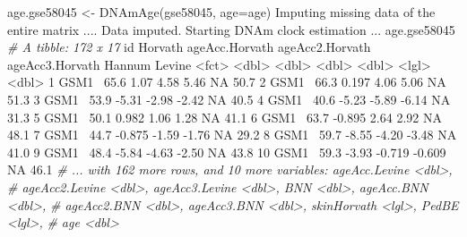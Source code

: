 \documentclass[]{article}
\newcommand{\hlnum}[1]{\textcolor[rgb]{0.816,0.125,0.439}{#1}}%
\newcommand{\hlstr}[1]{\textcolor[rgb]{0.251,0.627,0.251}{#1}}%
\newcommand{\hlcom}[1]{\textcolor[rgb]{0.502,0.502,0.502}{\textit{#1}}}%
\newcommand{\hlopt}[1]{\textcolor[rgb]{0,0,0}{#1}}%
\newcommand{\hlstd}[1]{\textcolor[rgb]{0.251,0.251,0.251}{#1}}%
\newcommand{\hlkwc}[1]{\textcolor[rgb]{0.251,0.251,0.251}{#1}}%
\newcommand{\hlkwd}[1]{\textcolor[rgb]{0.878,0.439,0.125}{#1}}%
\newenvironment{Shaded}{\begin{myshaded}}{\end{myshaded}}
\newcommand{\KeywordTok}[1]{\hlkwd{#1}}
\newcommand{\DataTypeTok}[1]{\hlkwc{#1}}
\newcommand{\DecValTok}[1]{\hlnum{#1}}
\newcommand{\FloatTok}[1]{\hlnum{#1}}
\newcommand{\StringTok}[1]{\hlstr{#1}}
\newcommand{\CommentTok}[1]{\hlcom{#1}}
\newcommand{\OtherTok}[1]{{#1}}
\newcommand{\OperatorTok}[1]{\hlopt{#1}}
\newcommand{\ErrorTok}[1]{\textcolor{errorcolor}{#1}}
\newcommand{\NormalTok}[1]{\hlstd{#1}}
\begin{document}
\begin{Shaded}
\begin{Highlighting}[]
\NormalTok{age.gse58045 <-}\StringTok{ }\KeywordTok{DNAmAge}\NormalTok{(gse58045, }\DataTypeTok{age=}\NormalTok{age)}
\NormalTok{  Imputing missing data of the entire matrix .... }
\NormalTok{  Data imputed. Starting DNAm clock estimation ...}
\NormalTok{age.gse58045}
  \CommentTok{# A tibble: 172 x 17}
\NormalTok{     id    Horvath ageAcc.Horvath ageAcc2.Horvath ageAcc3.Horvath Hannum Levine}
     \OperatorTok{<}\NormalTok{fct}\OperatorTok{>}\StringTok{   }\ErrorTok{<}\NormalTok{dbl}\OperatorTok{>}\StringTok{          }\ErrorTok{<}\NormalTok{dbl}\OperatorTok{>}\StringTok{           }\ErrorTok{<}\NormalTok{dbl}\OperatorTok{>}\StringTok{           }\ErrorTok{<}\NormalTok{dbl}\OperatorTok{>}\StringTok{ }\ErrorTok{<}\NormalTok{lgl}\OperatorTok{>}\StringTok{   }\ErrorTok{<}\NormalTok{dbl}\OperatorTok{>}
\StringTok{   }\DecValTok{1}\NormalTok{ GSM1}\OperatorTok{~}\StringTok{    }\FloatTok{65.6}          \FloatTok{1.07}            \FloatTok{4.58}            \FloatTok{5.46}  \OtherTok{NA}       \FloatTok{50.7}
   \DecValTok{2}\NormalTok{ GSM1}\OperatorTok{~}\StringTok{    }\FloatTok{66.3}          \FloatTok{0.197}           \FloatTok{4.06}            \FloatTok{5.06}  \OtherTok{NA}       \FloatTok{51.3}
   \DecValTok{3}\NormalTok{ GSM1}\OperatorTok{~}\StringTok{    }\FloatTok{53.9}         \FloatTok{-5.31}           \FloatTok{-2.98}           \FloatTok{-2.42}  \OtherTok{NA}       \FloatTok{40.5}
   \DecValTok{4}\NormalTok{ GSM1}\OperatorTok{~}\StringTok{    }\FloatTok{40.6}         \FloatTok{-5.23}           \FloatTok{-5.89}           \FloatTok{-6.14}  \OtherTok{NA}       \FloatTok{31.3}
   \DecValTok{5}\NormalTok{ GSM1}\OperatorTok{~}\StringTok{    }\FloatTok{50.1}          \FloatTok{0.982}           \FloatTok{1.06}            \FloatTok{1.28}  \OtherTok{NA}       \FloatTok{41.1}
   \DecValTok{6}\NormalTok{ GSM1}\OperatorTok{~}\StringTok{    }\FloatTok{63.7}         \FloatTok{-0.895}           \FloatTok{2.64}            \FloatTok{2.92}  \OtherTok{NA}       \FloatTok{48.1}
   \DecValTok{7}\NormalTok{ GSM1}\OperatorTok{~}\StringTok{    }\FloatTok{44.7}         \FloatTok{-0.875}          \FloatTok{-1.59}           \FloatTok{-1.76}  \OtherTok{NA}       \FloatTok{29.2}
   \DecValTok{8}\NormalTok{ GSM1}\OperatorTok{~}\StringTok{    }\FloatTok{59.7}         \FloatTok{-8.55}           \FloatTok{-4.20}           \FloatTok{-3.48}  \OtherTok{NA}       \FloatTok{41.0}
   \DecValTok{9}\NormalTok{ GSM1}\OperatorTok{~}\StringTok{    }\FloatTok{48.4}         \FloatTok{-5.84}           \FloatTok{-4.63}           \FloatTok{-2.50}  \OtherTok{NA}       \FloatTok{43.8}
  \DecValTok{10}\NormalTok{ GSM1}\OperatorTok{~}\StringTok{    }\FloatTok{59.3}         \FloatTok{-3.93}           \FloatTok{-0.719}          \FloatTok{-0.609} \OtherTok{NA}       \FloatTok{46.1}
  \CommentTok{# ... with 162 more rows, and 10 more variables: ageAcc.Levine <dbl>,}
  \CommentTok{#   ageAcc2.Levine <dbl>, ageAcc3.Levine <dbl>, BNN <dbl>, ageAcc.BNN <dbl>,}
  \CommentTok{#   ageAcc2.BNN <dbl>, ageAcc3.BNN <dbl>, skinHorvath <lgl>, PedBE <lgl>,}
  \CommentTok{#   age <dbl>}
\end{Highlighting}
\end{Shaded}
\end{document}
